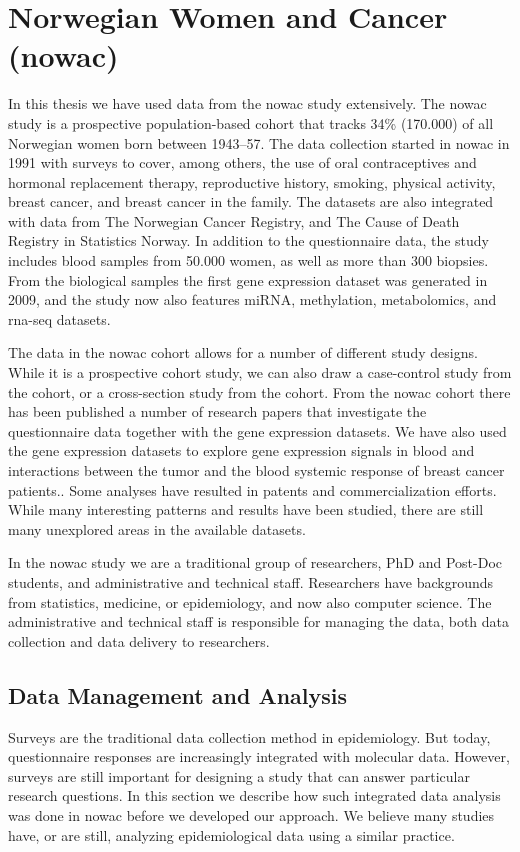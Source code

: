 \section{Norwegian Women and Cancer (\gls{nowac})}
In this thesis we have used data from the \gls{nowac} study extensively. 
The \gls{nowac} study is a prospective population-based cohort that tracks 34\%
(170.000) of all Norwegian women born between 1943–57.\cite{nowac} The data
collection started in \gls{nowac} in 1991 with surveys to cover, among others,
the use of oral contraceptives and hormonal replacement therapy, reproductive
history, smoking, physical activity, breast cancer, and breast cancer in the
family. The datasets are also integrated with data from The Norwegian Cancer
Registry, and The Cause of Death Registry in Statistics Norway. In addition
to the questionnaire data, the study includes blood samples from 50.000 women,
as well as more than 300 biopsies. From the biological samples the first gene
expression dataset was generated in 2009, and the study now also features miRNA,
methylation, metabolomics, and \gls{rna}-seq datasets. 

The data in the \gls{nowac} cohort allows for a number of different study
designs. While it is a prospective cohort study, we can also draw a case-control
study from the cohort, or a cross-section study from the cohort. From the
\gls{nowac} cohort there has been published a number of research papers that
investigate the questionnaire data together with the gene expression
datasets.\cite{olsen2013plasma,dumeaux2010deciphering}  We have also used the
gene expression datasets to explore gene expression signals in blood and
interactions between the tumor and the blood systemic response of breast cancer
patients.\cite{holden2017local, dumeaux2017interactions}. Some analyses have
resulted in patents\cite{blobrec} and commercialization efforts.  While many
interesting patterns and results have been studied, there are still many
unexplored areas in the available datasets.

In the \gls{nowac} study we are a traditional group of researchers, PhD and
Post-Doc students, and administrative and technical staff. Researchers have
backgrounds from statistics, medicine, or epidemiology, and now also computer
science. The administrative and technical staff is responsible for managing the
data, both data collection and data delivery to researchers. 

\subsection{Data Management and Analysis} 
Surveys are the traditional data collection method in epidemiology. But
today, questionnaire responses are increasingly integrated with molecular data.
However, surveys are still important for designing a study that can answer
particular research questions.  In this section we describe how such integrated
data analysis was done in \gls{nowac} before we developed our approach. We
believe many studies have, or are still, analyzing epidemiological data using
a similar practice. 

